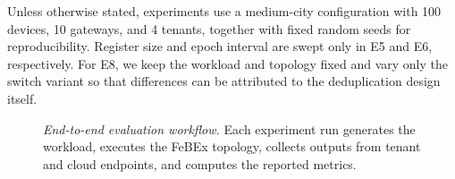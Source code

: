 Unless otherwise stated, experiments use a medium-city configuration with 100 devices, 10 gateways, and 4 tenants, together with fixed random seeds for reproducibility. Register size and epoch interval are swept only in E5 and E6, respectively. For E8, we keep the workload and topology fixed and vary only the switch variant so that differences can be attributed to the deduplication design itself.
\begin{figure}[t]
\centering
{}
\caption{\emph{End-to-end evaluation workflow.} Each experiment run generates the workload, executes the FeBEx topology, collects outputs from tenant and cloud endpoints, and computes the reported metrics.}
\label{fig:eval-workflow}
\end{figure}


